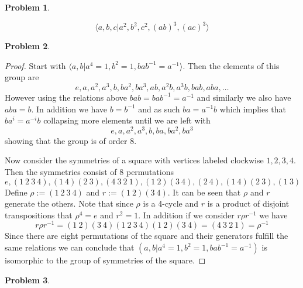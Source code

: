 \documentclass[10pt]{article}
\newcommand{\sk}{\vskip 10mm}
\theoremstyle{plain}
\newtheorem{problem}{Problem}
\theoremstyle{remark}
\begin{document}
\begin{problem} %
  
\end{problem}

\[\langle a,b,c | a^2,b^2,c^2,(ab)^3,(ac)^3 \rangle\]

\sk

\begin{problem} %
  
\end{problem}

\begin{proof}
  Start with $\langle a,b| a^4=1,b^2=1,bab^{-1}=a^{-1}\rangle$. Then the elements of this group
  are
  \[ e,a,a^2,a^3,b,ba^2,ba^3,ab,a^2b,a^3b,bab,aba,\ldots \]
  However using the relations above $bab=bab^{-1}=a^{-1}$ and similarly
  we also have $aba=b$. In addition we have $b=b^{-1}$ and as such $ba=a^{-1}b$
  which implies that $ba^i=a^{-i}b$ collapsing more elements until we are left with
  \[ e,a,a^2,a^3,b,ba,ba^2,ba^3 \]
  showing that the group is of order 8.

  Now consider the symmetries of a square with vertices labeled clockwise $1,2,3,4$.
  Then the symmetries consist of 8 permutations
  \[ e,(1\ 2\ 3\ 4),(1\ 4)(2\ 3),(4\ 3\ 2\ 1),(1\ 2)(3\ 4),(2\ 4),(1\ 4)(2\ 3),(1\ 3)\]
  Define $\rho:=(1\ 2\ 3\ 4)$ and $r:=(1\ 2)(3\ 4)$. It can be seen that $\rho$ and $r$
  generate the others. Note that since $\rho$ is a 4-cycle and
  $r$ is a product of disjoint transpositions that $\rho^4=e$ and $r^2=1$.
  In addition if we consider $r\rho r^{-1}$ we have
  \[ r\rho r^{-1}=(1\ 2)(3\ 4)(1\ 2\ 3\ 4)(1\ 2)(3\ 4)=(4\ 3\ 2\ 1)=\rho^{-1}\]
  Since there are eight permutations of the square and their generators fulfill the
  same relations we can conclude that
  $( a,b| a^4=1,b^2=1,bab^{-1}=a^{-1})$ is isomorphic to the group of symmetries of the
  square.
\end{proof}

\sk

\begin{problem} %
  
\end{problem}
\end{document}
